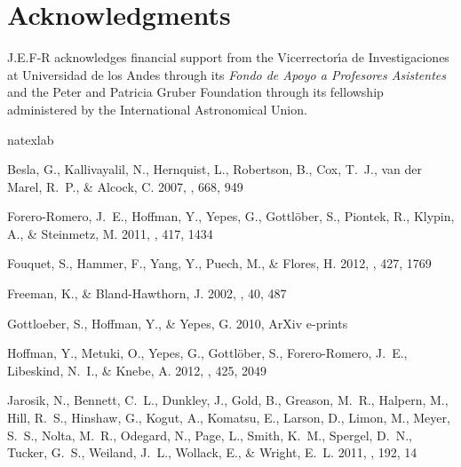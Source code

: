 \documentclass{emulateapj}
\begin{document}
\label{sec:conclusions}
\section*{Acknowledgments}  
J.E.F-R acknowledges financial support from the Vicerrector\'{\i}a de Investigaciones at Universidad de los Andes through its {\it Fondo de Apoyo a Profesores Asistentes} and the Peter and Patricia Gruber Foundation through its fellowship administered by the International Astronomical Union.



% 
\begin{thebibliography}{25}
\expandafter\ifx\csname natexlab\endcsname\relax\def\natexlab#1{#1}\fi

{Besla}, G., {Kallivayalil}, N., {Hernquist}, L., {Robertson}, B., {Cox},
  T.~J., {van der Marel}, R.~P., \& {Alcock}, C. 2007, \apj, 668, 949

{Forero-Romero}, J.~E., {Hoffman}, Y., {Yepes}, G., {Gottl{\"o}ber}, S.,
  {Piontek}, R., {Klypin}, A., \& {Steinmetz}, M. 2011, \mnras, 417, 1434

{Fouquet}, S., {Hammer}, F., {Yang}, Y., {Puech}, M., \& {Flores}, H. 2012,
  \mnras, 427, 1769

{Freeman}, K., \& {Bland-Hawthorn}, J. 2002, \araa, 40, 487

{Gottloeber}, S., {Hoffman}, Y., \& {Yepes}, G. 2010, ArXiv e-prints

{Hoffman}, Y., {Metuki}, O., {Yepes}, G., {Gottl{\"o}ber}, S., {Forero-Romero},
  J.~E., {Libeskind}, N.~I., \& {Knebe}, A. 2012, \mnras, 425, 2049

{Jarosik}, N., {Bennett}, C.~L., {Dunkley}, J., {Gold}, B., {Greason}, M.~R.,
  {Halpern}, M., {Hill}, R.~S., {Hinshaw}, G., {Kogut}, A., {Komatsu}, E.,
  {Larson}, D., {Limon}, M., {Meyer}, S.~S., {Nolta}, M.~R., {Odegard}, N.,
  {Page}, L., {Smith}, K.~M., {Spergel}, D.~N., {Tucker}, G.~S., {Weiland},
  J.~L., {Wollack}, E., \& {Wright}, E.~L. 2011, \apjs, 192, 14


\end{thebibliography}
\end{document}
